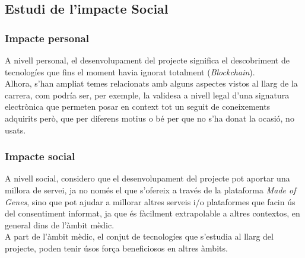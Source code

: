 \subsection{Estudi de l'impacte Social}
\subsubsection{Impacte personal}
A nivell personal, el desenvolupament del projecte significa el descobriment de tecnologíes que fins el moment havia ignorat totalment (\textit{Blockchain}).\\ 
\newline Alhora, s'han ampliat temes relacionats amb alguns aspectes vistos al llarg de la carrera, com podría ser, per exemple, la validesa a nivell legal d'una signatura electrònica que permeten posar en context tot un seguit de coneixements adquirits però, que per diferens motius o bé per que no s'ha donat la ocasió, no usats.

\subsubsection{Impacte social}
A nivell social, considero que el desenvolupament del projecte pot aportar una millora de servei, ja no només el que s'ofereix a través de la plataforma \textit{Made of Genes}, sino que pot ajudar a millorar altres serveis i/o plataformes que facin ús del consentiment informat, ja que és fàcilment extrapolable a altres contextos, en general dins de l'àmbit mèdic.\\
\newline A part de l'àmbit mèdic, el conjut de tecnologíes que s'estudia al llarg del projecte, poden tenir úsos força beneficiosos en altres àmbits.